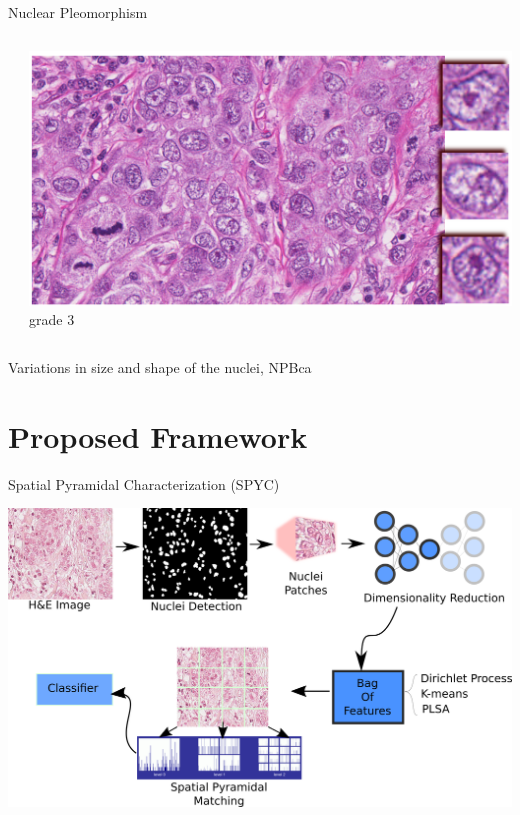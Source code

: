 \documentclass[usenames,dvipsnames]{beamer}
\begin{document}
\begin{frame}{Nuclear Pleomorphism}
{\begin{columns}
\begin{column}{0.33\textwidth}
\end{column}

\begin{column}{0.33\textwidth}
\includegraphics[width=\textwidth]{imagenes/grado3.png}
\\\centering \scriptsize grade 3

\end{column}
\end{columns}
      
  }
\centering Variations in size and shape of the nuclei, NPBca

\end{frame}


\section{Proposed Framework}
\begin{frame}{Spatial Pyramidal Characterization (SPYC)}

\includegraphics[width=\textwidth]{imagenes_cnn/metodonuevo.png}
    
\end{frame}
\end{document}

